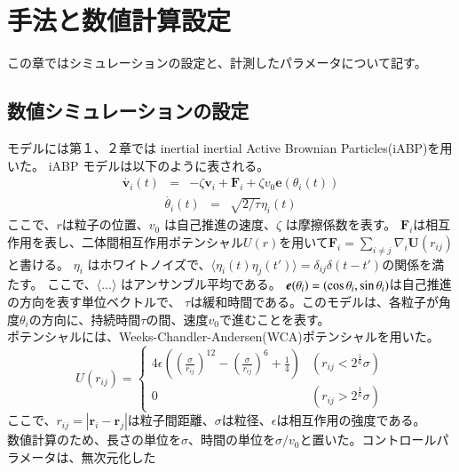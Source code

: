 \documentclass[/Users/ikedahajime/GitHub/reserch/master_report/thesis]{subfiles}
\begin{document}
\chapter{手法と数値計算設定}
この章ではシミュレーションの設定と、計測したパラメータについて記す。
\section{数値シミュレーションの設定}
モデルには第１、２章では inertial inertial Active Brownian Particles(iABP)を用いた。 iABP モデルは以下のように表される。
\begin{eqnarray}
    \dot{\bm{v}_i}(t)&=& - \zeta \bm{v}_i  +\bm{F}_i +\zeta v_0 \bm{e}(\theta_i(t))
\end{eqnarray}
\begin{eqnarray}
    \dot{\theta_i }(t) &=& \sqrt{2/\tau}\eta_i(t)
\end{eqnarray}
ここで、\mbox{\boldmath$r$}は粒子の位置、$v_0$ は自己推進の速度、$\zeta$ は摩擦係数を表す。
$\bm{F}_i$は相互作用を表し、二体間相互作用ポテンシャル$U(r)$を用いて$\bm{F}_i=\sum_{i\neq j} \nabla_i\bm{U}(r_{ij})$と書ける。
$\eta_i$ はホワイトノイズで、$\langle \eta_i(t) \eta_j(t') \rangle=\delta_{ij}\delta(t-t')$の関係を満たす。
ここで、$\langle \dots \rangle$ はアンサンブル平均である。
$\mbox{\boldmath$e$}(\theta_i)=(\cos\theta_i,\sin \theta_i)$は自己推進の方向を表す単位ベクトルで、
$\tau$は緩和時間である。このモデルは、各粒子が角度$\theta_i$の方向に、持続時間$\tau$の間、速度$v_0$で進むことを表す。\\
ポテンシャルには、Weeks-Chandler-Andersen(WCA)ポテンシャル\cite{weeksRoleRepulsiveForces1971}を用いた。
\begin{equation}
    U(r_{ij})=
    \begin{cases}
        4\epsilon\left(\left(\frac{\sigma}{r_{ij}}\right)^{12}-\left(\frac{\sigma}{r_{ij}}\right)^6+\frac{1}{4}\right) & (r_{ij}<2^{\frac{1}{6}}\sigma)\\
        0 &(r_{ij}>2^{\frac{1}{6}}\sigma)
    \end{cases}
\end{equation}
ここで、$r_{ij}=\left|\bm{r}_i-\bm{r}_j\right|$は粒子間距離、$\sigma$は粒径、$\epsilon$は相互作用の強度である。\\
数値計算のため、長さの単位を$\sigma$、時間の単位を$\sigma/v_0$と置いた。コントロールパラメータは、無次元化した
\end{document}
